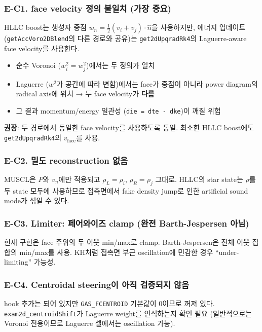 \documentclass[11pt]{article}
\begin{document}
\subsubsection*{E-C1. face velocity 정의 불일치 (가장 중요)}
HLLC boost는 생성자 중점 $w_n = \tfrac{1}{2}(v_i+v_j)\cdot\hat n$을 사용하지만,
에너지 업데이트 (\texttt{getAccVoro2DBlend}의 다른 경로와 공유)는
\texttt{get2dUpqradRk4}의 Laguerre-aware face velocity를 사용한다.

\begin{itemize}
  \item 순수 Voronoi ($w^2_i = w^2_j$)에서는 두 정의가 일치
  \item Laguerre ($w^2$가 공간에 따라 변함)에서는 face가 중점이 아니라
    power diagram의 radical axis에 위치 → 두 face velocity가 \textbf{다름}
  \item 그 결과 momentum/energy 일관성 (\texttt{die = dte - dke})이 깨질 위험
\end{itemize}

\textbf{권장}: 두 경로에서 동일한 face velocity를 사용하도록 통일.
최소한 HLLC boost에도 \texttt{get2dUpqradRk4}의 $v_\mathrm{face}$를 사용.

\subsubsection*{E-C2. 밀도 reconstruction 없음}
MUSCL은 $P$와 $v_n$에만 적용되고 $\rho_L = \rho_i$, $\rho_R = \rho_j$ 그대로.
HLLC의 star state는 $\rho$를 두 state 모두에 사용하므로 접촉면에서
fake density jump로 인한 artificial sound mode가 섞일 수 있다.

\subsubsection*{E-C3. Limiter: 페어와이즈 clamp (완전 Barth-Jespersen 아님)}
현재 구현은 face 주위의 두 이웃 min/max로 clamp. Barth-Jespersen은
전체 이웃 집합의 min/max를 사용. KH처럼 접촉면 부근 oscillation에
민감한 경우 ``under-limiting'' 가능성.

\subsubsection*{E-C4. Centroidal steering이 아직 검증되지 않음}
hook 추가는 되어 있지만 \texttt{GAS\_FCENTROID} 기본값이 0이므로 꺼져 있다.
\texttt{exam2d\_centroidShift}가 Laguerre weight를 인식하는지 확인 필요
(일반적으로는 Voronoi 전용이므로 Laguerre 셀에서는 oscillation 가능).
\end{document}

